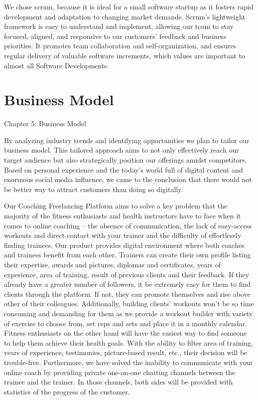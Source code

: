 \documentclass[12pt]{report}
\begin{document}
We chose scrum, because it is ideal for a small software startup as it fosters rapid development and adaptation to changing market demands. Scrum's lightweight framework is easy to understand and implement, allowing our team to stay focused, aligned, and responsive to our customers' feedback and business priorities. It promotes team collaboration and self-organization, and ensures regular delivery of valuable software increments, which values are important to almost all Software Developments.
\newpage

\section{Business Model}
Chapter 5: Business Model 

By analyzing industry trends and identifying opportunities we plan to tailor our business model. This tailored approach aims to not only effectively reach our target audience but also strategically position our offerings amidst competitors. Based on personal experience and the today’s world full of digital content and enormous social media influence, we came to the conclusion that there would not be better way to attract customers than doing so digitally.

Our Coaching Freelancing Platform aims to solve a key problem that the majority of the fitness enthusiasts and health instructors have to face when it comes to online coaching – the absence of communication, the lack of easy-access workouts and direct contact with your trainer and the difficulty of effortlessly finding trainees. Our product provides digital environment where both coaches and trainees benefit from each other. Trainers can create their own profile listing their expertise, awards and pictures, diplomas and certificates, years of experience, area of training, result of previous clients and their feedback. If they already have a greater number of followers, it be extremely easy for them to find clients through the platform. If not, they can promote themselves and rise above other of their colleagues. Additionally, building clients’ workouts won’t be so time consuming and demanding for them as we provide a workout builder with variety of exercise to choose from, set reps and sets and place it in a monthly calendar. Fitness enthusiasts on the other hand will have the easiest way to find someone to help them achieve their health goals. With the ability to filter area of training, years of experience, testimonies, picture-based result, etc., their decision will be trouble-free. Furthermore, we have solved the inability to communicate with your online coach by providing private one-on-one chatting channels between the trainee and the trainer. In those channels, both sides will be provided with statistics of the progress of the customer.
\end{document}

